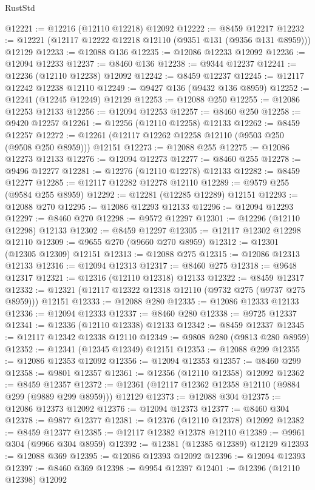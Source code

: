 \begin{lexlean}{RustStd}
\begin{coremodule}
@12221 := @12216 (@12110 @12218) @12092
@12222 := @8459 @12217
@12232 := @12221 (@12117 @12222 @12218 @12110 (@9351 @131 (@9356 @131 @8959))) @12129
@12233 := @12088 @136
@12235 := @12086 @12233 @12092
@12236 := @12094 @12233
@12237 := @8460 @136
@12238 := @9344 @12237
@12241 := @12236 (@12110 @12238) @12092
@12242 := @8459 @12237
@12245 := @12117 @12242 @12238 @12110
@12249 := @9427 @136 (@9432 @136 @8959)
@12252 := @12241 (@12245 @12249) @12129
@12253 := @12088 @250
@12255 := @12086 @12253 @12133
@12256 := @12094 @12253
@12257 := @8460 @250
@12258 := @9420 @12257
@12261 := @12256 (@12110 @12258) @12133
@12262 := @8459 @12257
@12272 := @12261 (@12117 @12262 @12258 @12110 (@9503 @250 (@9508 @250 @8959))) @12151
@12273 := @12088 @255
@12275 := @12086 @12273 @12133
@12276 := @12094 @12273
@12277 := @8460 @255
@12278 := @9496 @12277
@12281 := @12276 (@12110 @12278) @12133
@12282 := @8459 @12277
@12285 := @12117 @12282 @12278 @12110
@12289 := @9579 @255 (@9584 @255 @8959)
@12292 := @12281 (@12285 @12289) @12151
@12293 := @12088 @270
@12295 := @12086 @12293 @12133
@12296 := @12094 @12293
@12297 := @8460 @270
@12298 := @9572 @12297
@12301 := @12296 (@12110 @12298) @12133
@12302 := @8459 @12297
@12305 := @12117 @12302 @12298 @12110
@12309 := @9655 @270 (@9660 @270 @8959)
@12312 := @12301 (@12305 @12309) @12151
@12313 := @12088 @275
@12315 := @12086 @12313 @12133
@12316 := @12094 @12313
@12317 := @8460 @275
@12318 := @9648 @12317
@12321 := @12316 (@12110 @12318) @12133
@12322 := @8459 @12317
@12332 := @12321 (@12117 @12322 @12318 @12110 (@9732 @275 (@9737 @275 @8959))) @12151
@12333 := @12088 @280
@12335 := @12086 @12333 @12133
@12336 := @12094 @12333
@12337 := @8460 @280
@12338 := @9725 @12337
@12341 := @12336 (@12110 @12338) @12133
@12342 := @8459 @12337
@12345 := @12117 @12342 @12338 @12110
@12349 := @9808 @280 (@9813 @280 @8959)
@12352 := @12341 (@12345 @12349) @12151
@12353 := @12088 @299
@12355 := @12086 @12353 @12092
@12356 := @12094 @12353
@12357 := @8460 @299
@12358 := @9801 @12357
@12361 := @12356 (@12110 @12358) @12092
@12362 := @8459 @12357
@12372 := @12361 (@12117 @12362 @12358 @12110 (@9884 @299 (@9889 @299 @8959))) @12129
@12373 := @12088 @304
@12375 := @12086 @12373 @12092
@12376 := @12094 @12373
@12377 := @8460 @304
@12378 := @9877 @12377
@12381 := @12376 (@12110 @12378) @12092
@12382 := @8459 @12377
@12385 := @12117 @12382 @12378 @12110
@12389 := @9961 @304 (@9966 @304 @8959)
@12392 := @12381 (@12385 @12389) @12129
@12393 := @12088 @369
@12395 := @12086 @12393 @12092
@12396 := @12094 @12393
@12397 := @8460 @369
@12398 := @9954 @12397
@12401 := @12396 (@12110 @12398) @12092

\end{coremodule}
\end{lexlean}
